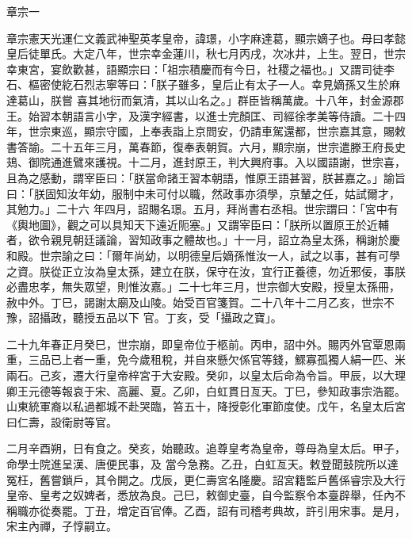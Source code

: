
\begin{pinyinscope}

 章宗一



 章宗憲天光運仁文義武神聖英孝皇帝，諱璟，小字麻達葛，顯宗嫡子也。母曰孝懿皇后徒單氏。大定八年，世宗幸金蓮川，秋七月丙戌，次冰井，上生。翌日，世宗幸東宮，宴飲歡甚，語顯宗曰：「祖宗積慶而有今日，社稷之福也。」又謂司徒李石、樞密使紇石烈志寧等曰：「朕子雖多，皇后止有太子一人。幸見嫡孫又生於麻達葛山，朕嘗
 喜其地衍而氣清，其以山名之。」群臣皆稱萬歲。十八年，封金源郡王。始習本朝語言小字，及漢字經書，以進士完顏匡、司經徐孝美等侍讀。二十四年，世宗東巡，顯宗守國，上奉表詣上京問安，仍請車駕還都，世宗嘉其意，賜敕書答諭。二十五年三月，萬春節，復奉表朝賀。六月，顯宗崩，世宗遣滕王府長史鳷、御院通進鷿來護視。十二月，進封原王，判大興府事。入以國語謝，世宗喜，且為之感動，謂宰臣曰：「朕當命諸王習本朝語，惟原王語甚習，朕甚嘉之。」諭旨曰：「朕固知汝年幼，服制中未可付以職，然政事亦須學，京輦之任，姑試爾才，其勉力。」二十六
 年四月，詔賜名璟。五月，拜尚書右丞相。世宗謂曰：「宮中有《輿地圖》，觀之可以具知天下遠近阨塞。」又謂宰臣曰：「朕所以置原王於近輔者，欲令親見朝廷議論，習知政事之體故也。」十一月，詔立為皇太孫，稱謝於慶和殿。世宗諭之曰：「爾年尚幼，以明德皇后嫡孫惟汝一人，試之以事，甚有可學之資。朕從正立汝為皇太孫，建立在朕，保守在汝，宜行正養德，勿近邪佞，事朕必盡忠孝，無失眾望，則惟汝嘉。」二十七年三月，世宗御大安殿，授皇太孫冊，赦中外。丁巳，謁謝太廟及山陵。始受百官箋賀。二十八年十二月乙亥，世宗不豫，詔攝政，聽授五品以下
 官。丁亥，受「攝政之寶」。



 二十九年春正月癸巳，世宗崩，即皇帝位于柩前。丙申，詔中外。賜丙外官覃恩兩重，三品已上者一重，免今歲租稅，并自來懸欠係官等錢，鰥寡孤獨人絹一匹、米兩石。己亥，遷大行皇帝梓宮于大安殿。癸卯，以皇太后命為令旨。甲辰，以大理卿王元德等報哀于宋、高麗、夏。乙卯，白虹貫日亙天。丁巳，參知政事宗浩罷。山東統軍裔以私過都城不赴哭臨，笞五十，降授彰化軍節度使。戊午，名皇太后宮曰仁壽，設衛尉等官。



 二月辛酉朔，日有食之。癸亥，始聽政。追尊皇考為皇帝，尊母為皇太后。甲子，命學士院進呈漢、唐便民事，及
 當今急務。乙丑，白虹亙天。敕登聞鼓院所以達冤枉，舊嘗鎖戶，其令開之。戊辰，更仁壽宮名隆慶。詔宮籍監戶舊係睿宗及大行皇帝、皇考之奴婢者，悉放為良。己巳，敕御史臺，自今監察令本臺辟舉，任內不稱職亦從奏罷。丁丑，增定百官俸。乙酉，詔有司稽考典故，許引用宋事。是月，宋主內禪，子惇嗣立。




\end{pinyinscope}
